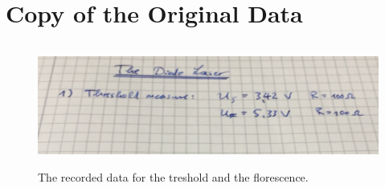 \appendix
\section{Copy of the Original Data}

\begin{figure}
  \centering
  \includegraphics[height=4cm]{pics/daten.jpg}
  \caption{The recorded data for the treshold and the florescence.}
  \label{}
\end{figure}
